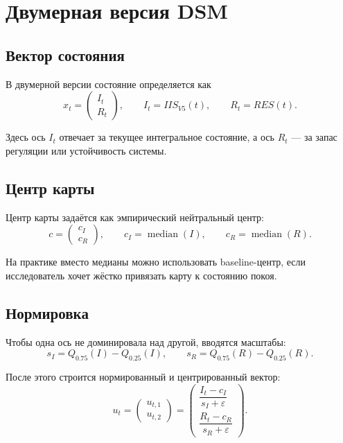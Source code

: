 \documentclass[12pt,a4paper]{article}
\begin{document}
\section{Двумерная версия DSM}
\subsection{Вектор состояния}
В двумерной версии состояние определяется как
\begin{equation}
x_t=
\begin{pmatrix}
I_t\\
R_t
\end{pmatrix},
\qquad
I_t = IIS_{V5}(t),
\qquad
R_t = RES(t).
\end{equation}

Здесь ось $I_t$ отвечает за текущее интегральное состояние, а ось $R_t$ --- за запас регуляции или устойчивость системы.

\subsection{Центр карты}
Центр карты задаётся как эмпирический нейтральный центр:
\begin{equation}
c=
\begin{pmatrix}
c_I\\
c_R
\end{pmatrix},
\qquad
c_I=\operatorname{median}(I),
\qquad
c_R=\operatorname{median}(R).
\end{equation}

На практике вместо медианы можно использовать baseline-центр, если исследователь хочет жёстко привязать карту к состоянию покоя.

\subsection{Нормировка}
Чтобы одна ось не доминировала над другой, вводятся масштабы:
\begin{equation}
s_I = Q_{0.75}(I)-Q_{0.25}(I),
\qquad
s_R = Q_{0.75}(R)-Q_{0.25}(R).
\end{equation}

После этого строится нормированный и центрированный вектор:
\begin{equation}
u_t=
\begin{pmatrix}
u_{t,1}\\
u_{t,2}
\end{pmatrix}
=
\begin{pmatrix}
\dfrac{I_t-c_I}{s_I+\varepsilon}\\[8pt]
\dfrac{R_t-c_R}{s_R+\varepsilon}
\end{pmatrix}.
\end{equation}
\end{document}
